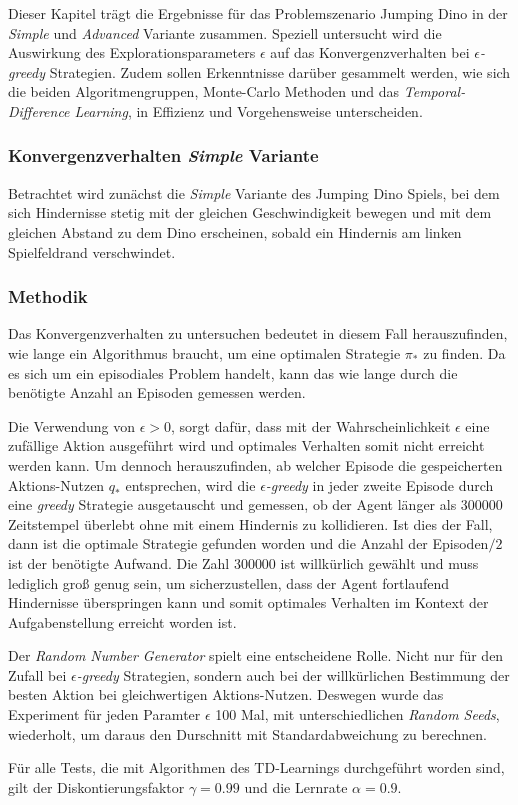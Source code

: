 Dieser Kapitel trägt die Ergebnisse für das Problemszenario Jumping Dino in der \textit{Simple} und \textit{Advanced} Variante zusammen. Speziell untersucht wird die Auswirkung des Explorationsparameters $\epsilon$ auf das Konvergenzverhalten bei $\epsilon$\textit{-greedy} Strategien. Zudem sollen Erkenntnisse darüber gesammelt werden, wie sich die beiden Algoritmengruppen, Monte-Carlo Methoden und das \textit{Temporal-Difference Learning}, in Effizienz und Vorgehensweise unterscheiden.


\subsubsection{Konvergenzverhalten \textit{Simple} Variante}\label{sec:resJumpSimple}
Betrachtet wird zunächst die \textit{Simple} Variante des Jumping Dino Spiels, bei dem sich Hindernisse stetig mit der gleichen Geschwindigkeit bewegen und mit  dem gleichen Abstand zu dem Dino erscheinen, sobald ein Hindernis am linken Spielfeldrand verschwindet.

\subsubsection*{Methodik}
 Das Konvergenzverhalten zu untersuchen bedeutet in diesem Fall herauszufinden, wie lange ein Algorithmus braucht, um eine optimalen Strategie $\pi_*$ zu finden. Da es sich um ein episodiales Problem handelt, kann das \glqq wie lange\grqq{} durch die benötigte Anzahl an Episoden gemessen werden. 
\par
Die Verwendung von $\epsilon > 0$, sorgt dafür, dass mit der Wahrscheinlichkeit $\epsilon$ eine zufällige Aktion ausgeführt wird und optimales Verhalten somit nicht erreicht werden kann. Um dennoch herauszufinden, ab welcher Episode die gespeicherten Aktions-Nutzen $q_*$ entsprechen, wird die $\epsilon$\textit{-greedy} in jeder zweite Episode durch eine \textit{greedy} Strategie ausgetauscht und gemessen, ob der Agent länger als 300000 Zeitstempel überlebt ohne mit einem Hindernis zu kollidieren. Ist dies der Fall, dann ist die optimale Strategie gefunden worden und die Anzahl der Episoden$/2$ ist der benötigte Aufwand. Die Zahl 300000 ist willkürlich gewählt und muss lediglich groß genug sein, um sicherzustellen, dass der Agent fortlaufend Hindernisse überspringen kann und somit optimales Verhalten im Kontext der Aufgabenstellung erreicht worden ist.  
\par 
Der \textit{Random Number Generator} spielt eine entscheidene Rolle. Nicht nur für den Zufall bei $\epsilon$\textit{-greedy} Strategien, sondern auch bei der willkürlichen Bestimmung der besten Aktion bei gleichwertigen Aktions-Nutzen. Deswegen wurde das Experiment für jeden Paramter $\epsilon$ 100 Mal, mit unterschiedlichen \textit{Random Seeds}, wiederholt, um daraus den Durschnitt mit Standardabweichung zu berechnen.
\par 
Für alle Tests, die mit Algorithmen des TD-Learnings durchgeführt worden sind, gilt der Diskontierungsfaktor $\gamma = 0.99$ und die Lernrate $\alpha = 0.9$.
\par 

